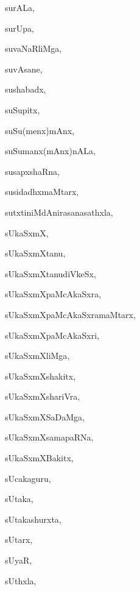 \begin{multicols}{3}
{\noindent
{surALa}, \pageref{surALa}

\noindent
{surUpa}, \pageref{surUpa}

\noindent
{suvaNaRliMga}, \pageref{suvaNaRliMga}

\noindent
{suvAsane}, \pageref{suvAsane}

\noindent
{sushabadx}, \pageref{sushabadx}

\noindent
{suSupitx}, \pageref{suSupitx}

\noindent
{suSu(menx)mAnx}, \pageref{suSumenxmAnx}

\noindent
{suSumanx(mAnx)nALa}, \pageref{suSumanxmAnxnALa}

\noindent
{susapxshaRna}, \pageref{susapxshaRna}

\noindent
{susidadhxmaMtarx}, \pageref{susidadhxmaMtarx}

\noindent
{sutxtiniMdAnirasanasathxla}, \pageref{sutxtiniMdAnirasanasathxla}

\noindent
{sUkaSxmX}, \pageref{sUkaSxmX}

\noindent
{sUkaSxmXtanu}, \pageref{sUkaSxmXtanu}

\noindent
{sUkaSxmXtanudiVkeSx}, \pageref{sUkaSxmXtanudiVkeSx}

\noindent
{sUkaSxmXpaMcAkaSxra}, \pageref{sUkaSxmXpaMcAkaSxra}

\noindent
{sUkaSxmXpaMcAkaSxramaMtarx}, \pageref{sUkaSxmXpaMcAkaSxramaMtarx}

\noindent
{sUkaSxmXpaMcAkaSxri}, \pageref{sUkaSxmXpaMcAkaSxri}

\noindent
{sUkaSxmXliMga}, \pageref{sUkaSxmXliMga}

\noindent
{sUkaSxmXshakitx}, \pageref{sUkaSxmXshakitx}

\noindent
{sUkaSxmXshariVra}, \pageref{sUkaSxmXshariVra}

\noindent
{sUkaSxmXSaDaMga}, \pageref{sUkaSxmXSaDaMga}

\noindent
{sUkaSxmXsamapaRNa}, \pageref{sUkaSxmXsamapaRNa}

\noindent
{sUkaSxmXBakitx}, \pageref{sUkaSxmXBakitx}

\noindent
{sUcakaguru}, \pageref{sUcakaguru}

\noindent
{sUtaka}, \pageref{sUtaka}

\noindent
{sUtakashurxta}, \pageref{sUtakashurxta}

\noindent
{sUtarx}, \pageref{sUtarx}

\noindent
{sUyaR}, \pageref{sUyaR}

\noindent
{sUthxla}, \pageref{sUthxla}

}
\end{multicols}

